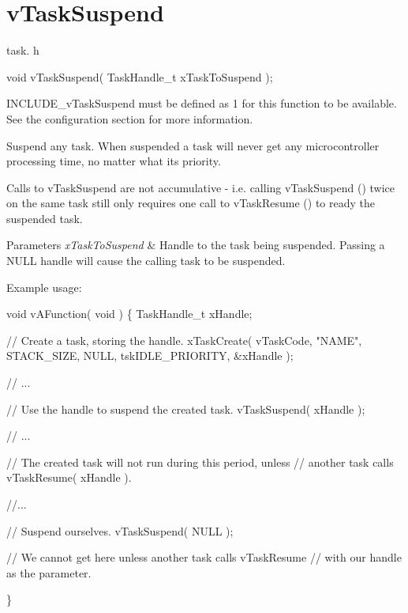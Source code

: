 \hypertarget{group__v_task_suspend}{}\section{v\+Task\+Suspend}
\label{group__v_task_suspend}
task. h 
\begin{DoxyPre}void vTaskSuspend( TaskHandle\_t xTaskToSuspend );\end{DoxyPre}


I\+N\+C\+L\+U\+D\+E\+\_\+v\+Task\+Suspend must be defined as 1 for this function to be available. See the configuration section for more information.

Suspend any task. When suspended a task will never get any microcontroller processing time, no matter what its priority.

Calls to v\+Task\+Suspend are not accumulative -\/ i.\+e. calling v\+Task\+Suspend () twice on the same task still only requires one call to v\+Task\+Resume () to ready the suspended task.


\begin{DoxyParams}{Parameters}
{\em x\+Task\+To\+Suspend} & Handle to the task being suspended. Passing a N\+U\+L\+L handle will cause the calling task to be suspended.\\
\hline
\end{DoxyParams}
Example usage\+: 
\begin{DoxyPre}
void vAFunction( void )
\{
TaskHandle\_t xHandle;
\begin{DoxyVerb}// Create a task, storing the handle.
xTaskCreate( vTaskCode, "NAME", STACK_SIZE, NULL, tskIDLE_PRIORITY, &xHandle );

// ...

// Use the handle to suspend the created task.
vTaskSuspend( xHandle );

// ...

// The created task will not run during this period, unless
// another task calls vTaskResume( xHandle ).

//...


// Suspend ourselves.
vTaskSuspend( NULL );

// We cannot get here unless another task calls vTaskResume
// with our handle as the parameter.
\end{DoxyVerb}

\}
  \end{DoxyPre}
 